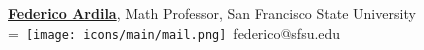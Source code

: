 \documentclass[]{plushcv}
\begin{document}
\begin{minipage}[t]{0.25\textwidth}


\sectionsep
\href{https://fardila.com/}{\textbf{Federico Ardila}}, Math Professor, San Francisco State University 
\\
\begingroup
{}=\hbox{
\texttt{[image: icons/main/mail.png]}\hspace{0.3cm} federico@sfsu.edu 
}
\parbox{\wd0}{}
\endgroup










\end{minipage} 
\end{document}
